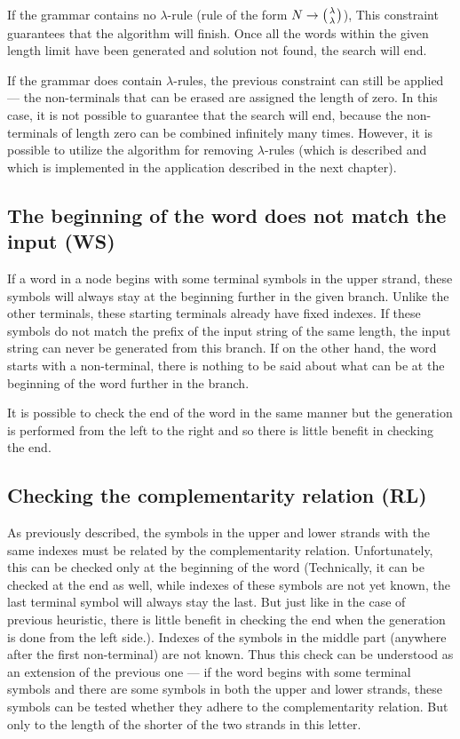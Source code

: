 If the grammar contains no $\lambda$-rule (rule of the form $N \rightarrow \wkpair{\lambda}{\lambda}$), This constraint guarantees that the algorithm will finish. Once all the words within the given length limit have been generated and solution not found, the search will end.

If the grammar does contain $\lambda$-rules, the previous constraint can still be applied --- the non-terminals that can be erased are assigned the length of zero. In this case, it is not possible to guarantee that the search will end, because the non-terminals of length zero can be combined infinitely many times. However, it is possible to utilize the algorithm for removing $\lambda$-rules (which is described \cite{WK_CYK} and which is implemented in the application described in the next chapter).

\subsection{The beginning of the word does not match the input (WS)}
If a word in a node begins with some terminal symbols in the upper strand, these symbols will always stay at the beginning further in the given branch. Unlike the other terminals, these starting terminals already have fixed indexes. If these symbols do not match the prefix of the input string of the same length, the input string can never be generated from this branch.
If on the other hand, the word starts with a non-terminal, there is nothing to be said about what can be at the beginning of the word further in the branch.

It is possible to check the end of the word in the same manner but the generation is performed from the left to the right and so there is little benefit in checking the end.

\subsection{Checking the complementarity relation (RL)}
As previously described, the symbols in the upper and lower strands with the same indexes must be related by the complementarity relation. Unfortunately, this can be checked only at the beginning of the word (Technically, it can be checked at the end as well, while indexes of these symbols are not yet known, the last terminal symbol will always stay the last. But just like in the case of previous heuristic, there is little benefit in checking the end when the generation is done from the left side.). Indexes of the symbols in the middle part (anywhere after the first non-terminal) are not known. Thus this check can be understood as an extension of the previous one --- if the word begins with some terminal symbols and there are some symbols in both the upper and lower strands, these symbols can be tested whether they adhere to the complementarity relation. But only to the length of the shorter of the two strands in this letter.

